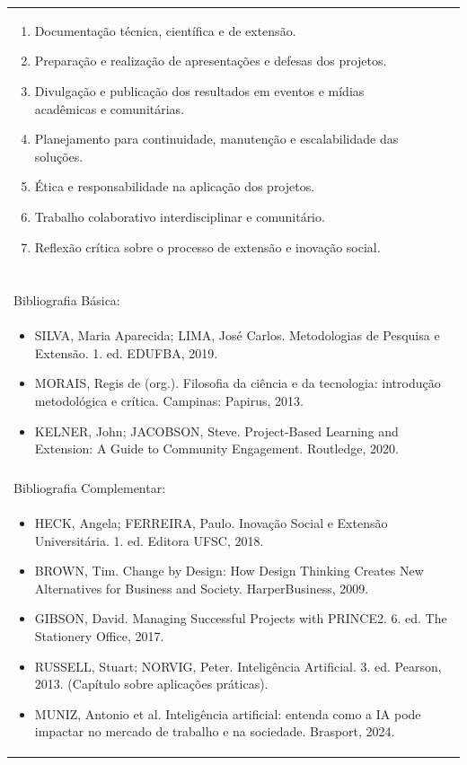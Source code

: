 \documentclass[11pt]{article}
\begin{document}
\begin{center}
\begin{longtable}{|p{4cm}|p{4cm}|p{4cm}|p{4cm}|}
{\begin{enumerate}
\item Documentação técnica, científica e de extensão.
\item Preparação e realização de apresentações e defesas dos projetos.
\item Divulgação e publicação dos resultados em eventos e mídias acadêmicas e comunitárias.
\item Planejamento para continuidade, manutenção e escalabilidade das soluções.
\item Ética e responsabilidade na aplicação dos projetos.
\item Trabalho colaborativo interdisciplinar e comunitário.
\item Reflexão crítica sobre o processo de extensão e inovação social.\end{enumerate}}\\
\multicolumn{4}{|p{16cm}|}{}\\
\multicolumn{4}{|p{16cm}|}{}\\
\multicolumn{4}{|p{16cm}|}{\vspace{-1cm}}\\
\multicolumn{4}{|p{16cm}|}{}\\
\hline
\multicolumn{4}{|p{16cm}|}{Bibliografia Básica:}\\
\multicolumn{4}{|p{16cm}|}{%
\begin{itemize}\item SILVA, Maria Aparecida; LIMA, José Carlos. Metodologias de Pesquisa e Extensão. 1. ed. EDUFBA, 2019.
\item MORAIS, Regis de (org.). Filosofia da ciência e da tecnologia: introdução metodológica e crítica. Campinas: Papirus, 2013.
\item KELNER, John; JACOBSON, Steve. Project-Based Learning and Extension: A Guide to Community Engagement. Routledge, 2020.\end{itemize}}\\
\multicolumn{4}{|p{16cm}|}{}\\
\hline
\multicolumn{4}{|p{16cm}|}{Bibliografia Complementar:}\\
\multicolumn{4}{|p{16cm}|}{%
\begin{itemize}\item HECK, Angela; FERREIRA, Paulo. Inovação Social e Extensão Universitária. 1. ed. Editora UFSC, 2018.
\item BROWN, Tim. Change by Design: How Design Thinking Creates New Alternatives for Business and Society. HarperBusiness, 2009.
\item GIBSON, David. Managing Successful Projects with PRINCE2. 6. ed. The Stationery Office, 2017.
\item RUSSELL, Stuart; NORVIG, Peter. Inteligência Artificial. 3. ed. Pearson, 2013. (Capítulo sobre aplicações práticas).
\item MUNIZ, Antonio et al. Inteligência artificial: entenda como a IA pode impactar no mercado de trabalho e na sociedade. Brasport, 2024.\end{itemize}}\\
\hline
\end{longtable}
\end{center}
\end{document}
